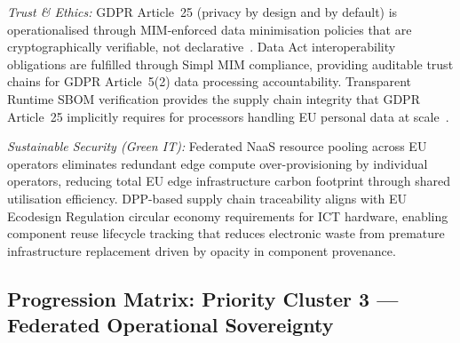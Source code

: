 \begin{enumerate}
\textit{Trust \& Ethics:}
GDPR Article~25 (privacy by design and by default) is operationalised through
MIM-enforced data minimisation policies that are cryptographically verifiable, not
declarative~\cite{gdpr}. Data Act interoperability obligations are fulfilled through
Simpl MIM compliance, providing auditable trust chains for GDPR Article~5(2) data
processing accountability. Transparent Runtime SBOM verification provides the
supply chain integrity that GDPR Article~25 implicitly requires for processors
handling EU personal data at scale~\cite{gdpr}.

\textit{Sustainable Security (Green IT):}
Federated NaaS resource pooling across EU operators eliminates redundant edge compute
over-provisioning by individual operators, reducing total EU edge infrastructure carbon
footprint through shared utilisation efficiency. DPP-based supply chain traceability
aligns with EU Ecodesign Regulation circular economy requirements for ICT hardware,
enabling component reuse lifecycle tracking that reduces electronic waste from
premature infrastructure replacement driven by opacity in component provenance.

\end{enumerate}


\newpage
\subsection{Progression Matrix: Priority Cluster 3 --- Federated Operational Sovereignty}

